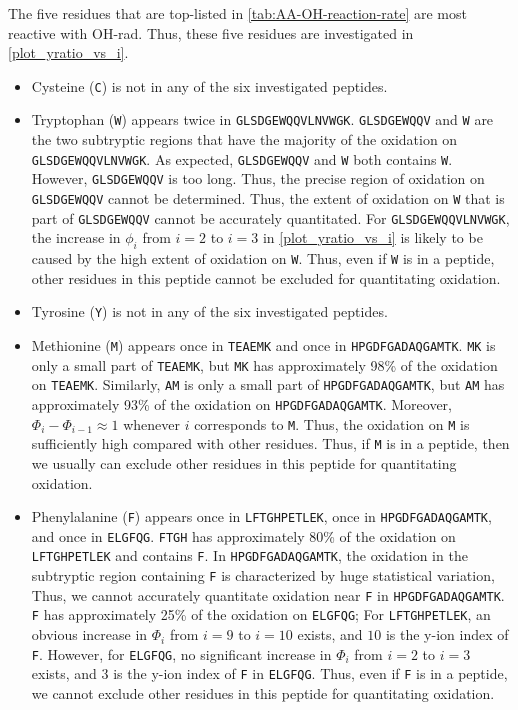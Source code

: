 The five residues that are top-listed in \cref{tab:AA-OH-reaction-rate} are most reactive with \gls{OH-rad}.
Thus, these five residues are investigated in \cref{plot_yratio_vs_i}. 
\begin{itemize}[nolistsep]
\item 
Cysteine   (\texttt{C}) is not in any of the six investigated peptides.
\item 
Tryptophan (\texttt{W}) appears twice in \texttt{GLSDGEWQQVLNVWGK}. 
\texttt{GLSDGEWQQV} and \texttt{W} are the two subtryptic regions that have the majority of the oxidation on \texttt{GLSDGEWQQVLNVWGK}. 
As expected, \texttt{GLSDGEWQQV} and \texttt{W} both contains \texttt{W}.
However, \texttt{GLSDGEWQQV} is too long.
Thus, the precise region of oxidation on \texttt{GLSDGEWQQV} cannot be determined.
Thus, the extent of oxidation on \texttt{W} that is part of \texttt{GLSDGEWQQV} cannot be accurately quantitated.
For \texttt{GLSDGEWQQVLNVWGK},
		the increase in $\phi_i$ from $i=2$ to $i=3$ in \cref{plot_yratio_vs_i} is likely to be caused by the high extent of oxidation on \texttt{W}.
Thus, even if \texttt{W} is in a peptide, other residues in this peptide cannot be excluded for quantitating oxidation.
\item	
Tyrosine   (\texttt{Y}) is not in any of the six investigated peptides.
\item
Methionine (\texttt{M}) appears once in \texttt{TEAEMK} and once in \texttt{HPGDFGADAQGAMTK}.
\texttt{MK} is only a small part of \texttt{TEAEMK}, 
	but \texttt{MK} has approximately 98\% of the oxidation on \texttt{TEAEMK}. 
Similarly, \texttt{AM} is only a small part of \texttt{HPGDFGADAQGAMTK}, 
	but \texttt{AM} has approximately 93\% of the oxidation on \texttt{HPGDFGADAQGAMTK}. 
Moreover, \(\Phi_i - \Phi_{i-1} \approx 1\) whenever \(i\) corresponds to \texttt{M}.
Thus, the oxidation on \texttt{M} is sufficiently high compared with other residues. 
Thus, if \texttt{M} is in a peptide, then we usually can exclude other residues in this peptide for quantitating oxidation.	
\item
Phenylalanine (\texttt{F}) appears once in \texttt{LFTGHPETLEK}, once in \texttt{HPGDFGADAQGAMTK}, and once in \texttt{ELGFQG}.
\texttt{FTGH} has approximately 80\% of the oxidation on \texttt{LFTGHPETLEK} and contains \texttt{F}.
In \texttt{HPGDFGADAQGAMTK}, the oxidation in the subtryptic region containing \texttt{F} is characterized by huge statistical variation,
Thus, we cannot accurately quantitate oxidation near \texttt{F} in \texttt{HPGDFGADAQGAMTK}.
	\texttt{F} has approximately 25\% of the oxidation on \texttt{ELGFQG};
For \texttt{LFTGHPETLEK}, an obvious increase in \(\Phi_i\) from \(i=9\) to \(i=10\) exists, and \(10\) is the y-ion index of \texttt{F}.
However, for \texttt{ELGFQG}, no significant increase in \(\Phi_i\) from \(i=2\) to \(i=3\) exists, 
		and \(3\) is the y-ion index of \texttt{F} in \texttt{ELGFQG}.
Thus, even if \texttt{F} is in a peptide, we cannot exclude other residues in this peptide for quantitating oxidation.
\end{itemize}

